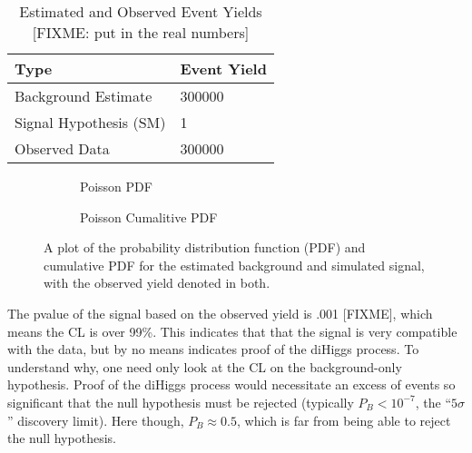     \begin{table}[tbh]
       \begin{center}
           \caption{Estimated and Observed Event Yields [FIXME: put in the real numbers]}
           \label{tab:event_yield}
           \footnotesize
           \begin{tabular}{|l|l|}
           \toprule
               Type  &	Event Yield \\
               \midrule
               Background Estimate  & 300000 \\
               Signal Hypothesis (SM) & 1 \\
               Observed Data & 300000 \\
           \bottomrule
           \end{tabular}
       \end{center}
    \end{table}

    \begin{figure} %
        \centering
        \begin{subfigure}{0.4\textwidth} 
             
            \caption{Poisson PDF}
            \label{fig:poisson_sig:pdf}
        \end{subfigure}
        \begin{subfigure}{0.4\textwidth}
             
            \caption{Poisson Cumalitive PDF}
            \label{fig:poisson_sig:Cpdf}
        \end{subfigure}
        \caption{
            A plot of the probability distribution function (PDF)
                and cumulative PDF for the estimated background and simulated signal,
                with the observed yield denoted in both.
        }
    \end{figure}

    The pvalue of the signal based on the observed yield is .001 [FIXME],
        which means the CL is over 99\%.
    This indicates that that the signal is very compatible with the data,
        but by no means indicates proof of the diHiggs process.
    To understand why, one need only look at the CL on the background-only hypothesis.
    Proof of the diHiggs process would necessitate an excess of events so significant that
        the null hypothesis must be rejected (typically $P_B < 10^{-7}$, the ``$5\sigma$'' discovery limit).
    Here though, $P_B \approx 0.5$, which is far from being able to reject the null hypothesis.

